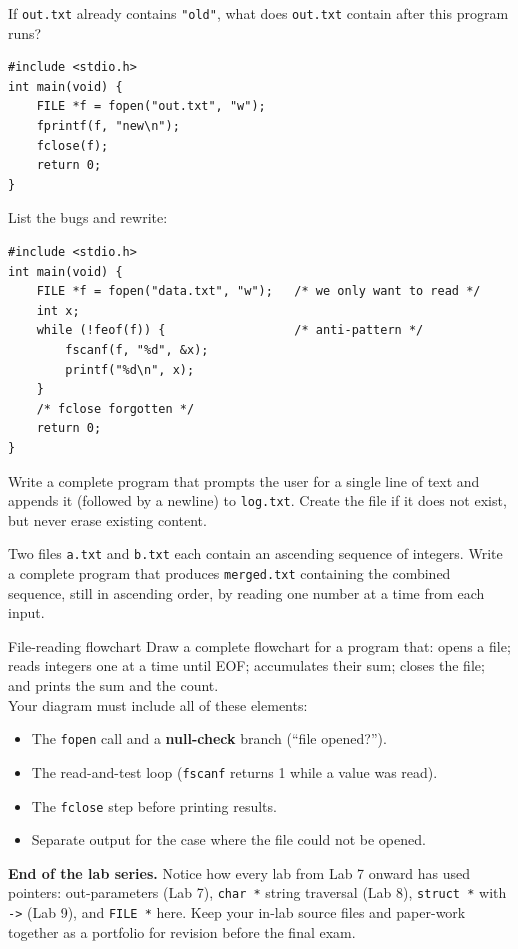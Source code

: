 \documentclass[11pt]{article}
\begin{document}
\begin{trace}
If \texttt{out.txt} already contains \texttt{"old"}, what does \texttt{out.txt} contain
after this program runs?
\begin{lstlisting}
#include <stdio.h>
int main(void) {
    FILE *f = fopen("out.txt", "w");
    fprintf(f, "new\n");
    fclose(f);
    return 0;
}
\end{lstlisting}
\end{trace}

\begin{bug}
List the bugs and rewrite:
\begin{lstlisting}
#include <stdio.h>
int main(void) {
    FILE *f = fopen("data.txt", "w");   /* we only want to read */
    int x;
    while (!feof(f)) {                  /* anti-pattern */
        fscanf(f, "%d", &x);
        printf("%d\n", x);
    }
    /* fclose forgotten */
    return 0;
}
\end{lstlisting}
\end{bug}

\begin{writecode}
Write a complete program that prompts the user for a single line of text and
appends it (followed by a newline) to \texttt{log.txt}. Create the file if it does
not exist, but never erase existing content.
\end{writecode}

\begin{writecode}
Two files \texttt{a.txt} and \texttt{b.txt} each contain an ascending sequence of
integers. Write a complete program that produces \texttt{merged.txt} containing the
combined sequence, still in ascending order, by reading one number at a time from
each input.
\end{writecode}

\begin{drawex}{File-reading flowchart}
Draw a complete flowchart for a program that:
opens a file; reads integers one at a time until EOF; accumulates their sum;
closes the file; and prints the sum and the count.\\[4pt]
Your diagram must include all of these elements:
\begin{itemize}[nosep,leftmargin=*]
  \item The \texttt{fopen} call and a \textbf{null-check} branch (``file opened?'').
  \item The read-and-test loop (\texttt{fscanf} returns 1 while a value was read).
  \item The \texttt{fclose} step before printing results.
  \item Separate output for the case where the file could not be opened.
\end{itemize}
\end{drawex}

\vspace{6pt}
\noindent\textbf{End of the lab series.} Notice how every lab from Lab 7 onward has used pointers:
out-parameters (Lab 7), \texttt{char *} string traversal (Lab 8), \texttt{struct *} with \texttt{->}
(Lab 9), and \texttt{FILE *} here. Keep your in-lab source files and paper-work together as a
portfolio for revision before the final exam.
\end{document}
